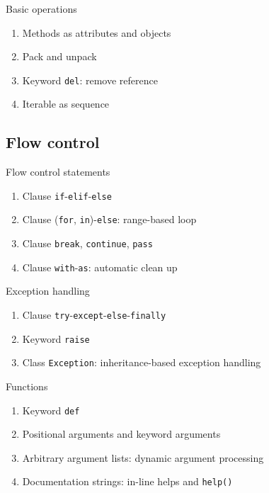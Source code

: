 \documentclass[english, nochinese]{../TeXTemplate/pkuslide}
\begin{document}
\begin{frame}[fragile]{Basic operations}
\begin{enumerate}
\item Methods as attributes and objects
\item Pack and unpack
\item Keyword \verb"del": remove reference
\item Iterable as sequence
\end{enumerate}
\end{frame}

\subsection{Flow control}

\begin{frame}[fragile]{Flow control statements}
\begin{enumerate}
\item Clause \verb"if"-\verb"elif"-\verb"else"
\item Clause (\verb"for", \verb"in")-\verb"else": range-based loop
\item Clause \verb"break", \verb"continue", \verb"pass"
\item Clause \verb"with"-\verb"as": automatic clean up
\end{enumerate}
\end{frame}

\begin{frame}[fragile]{Exception handling}
\begin{enumerate}
\item Clause \verb"try"-\verb"except"-\verb"else"-\verb"finally"
\item Keyword \verb"raise"
\item Class \verb"Exception": inheritance-based exception handling
\end{enumerate}
\end{frame}

\begin{frame}[fragile]{Functions}
\begin{enumerate}
\item Keyword \verb"def"
\item Positional arguments and keyword arguments
\item Arbitrary argument lists: dynamic argument processing
\item Documentation strings: in-line helps and \verb"help()"
\end{enumerate}
\end{frame}
\end{document}
